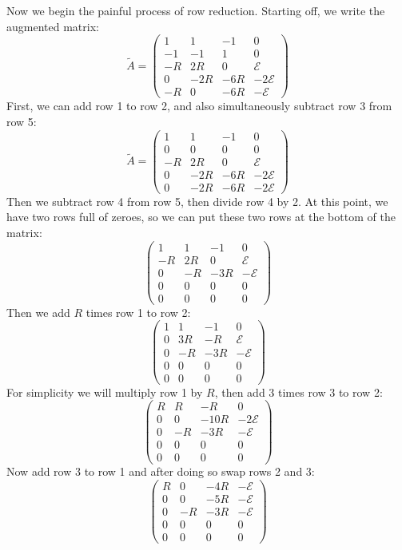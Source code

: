\documentclass{article}
\begin{document}
\begin{solution}
	Now we begin the painful process of row reduction. Starting off, we write the augmented matrix: 
	\[
		\tilde A = \begin{pmatrix} 1 &1 & -1 & 0\\ -1 & -1 & 1 & 0\\ -R & 2R & 0 & \mathcal E \\ 
		0 & -2R & -6R & -2\mathcal E\\ -R & 0 & -6R & -\mathcal E \end{pmatrix} 
	\] 
	First, we can add row 1 to row 2, and also simultaneously subtract row 3 from row 5:
	\[
		\tilde A = \begin{pmatrix} 1 & 1 & -1 & 0 \\ 0&0&0&0\\-R&2R&0&\mathcal E\\0&-2R&-6R &-2\mathcal E\\
		0&-2R&-6R&-2\mathcal E\end{pmatrix} 
	\] 
	Then we subtract row 4 from row 5, then divide row 4 by 2. At this point, we have two rows full of zeroes, 
	so we can put these two rows at the bottom of the matrix: 
	\[
		\begin{pmatrix} 1 & 1 & -1 &0\\-R&2R&0&\mathcal E\\0&-R&-3R&-\mathcal E\\0&0&0&0\\0&0&0&0 \end{pmatrix} 
	\] 
	Then we add $R$ times row 1 to row 2:
	\[
		\begin{pmatrix} 1 & 1& -1 &0\\0 & 3R & -R & \mathcal E\\0 & -R & -3R & -\mathcal E\\ 0&0&0&0\\0&0&0&0
		\end{pmatrix} 
	\] 
	For simplicity we will multiply row 1 by $R$, then add 3 times row 3 to row 2:
	\[
		\begin{pmatrix} R & R &-R&0\\0&0&-10R&-2\mathcal E\\0 &-R&-3R&-\mathcal E\\0&0&0&0\\0&0&0&0
		\end{pmatrix} 
	\] 
	Now add row 3 to row 1 and after doing so swap rows 2 and 3:
	\[
		\begin{pmatrix} R&0&-4R &-\mathcal E\\0&0&-5R &-\mathcal E\\0&-R&-3R&-\mathcal E\\0&0&0&0\\0&0&0&0

\end{pmatrix}\]
\end{solution}
\end{document}
